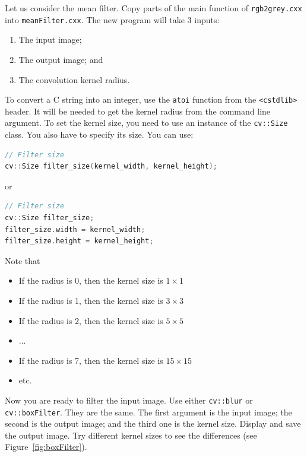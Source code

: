 \documentclass[english,a4paper,12pt,oneside]{article}
\begin{document}
Let us consider the mean filter. 
Copy parts of the main function of \verb+rgb2grey.cxx+ into \verb+meanFilter.cxx+.
The new program will take 3 inputs: 
\begin{enumerate}
	\item The input image;
	\item The output image; and
	\item The convolution kernel radius.
\end{enumerate}
To convert a C string into an integer, use the \verb+atoi+ function from the \verb+<cstdlib>+ header. 
It will be needed to get the kernel radius from the command line argument. 
To set the kernel size, you need to use an instance of the \verb+cv::Size+ class. 
You also have to specify its size. 
You can use:
\begin{lstlisting}[language=c++]
// Filter size
cv::Size filter_size(kernel_width, kernel_height);
\end{lstlisting}
or 
\begin{lstlisting}[language=c++]
// Filter size
cv::Size filter_size;
filter_size.width = kernel_width;
filter_size.height = kernel_height;
\end{lstlisting}
Note that 
\begin{itemize}
	\item If the radius is 0, then the kernel size is $1\times1$    
	\item If the radius is 1, then the kernel size is $3\times3$    
	\item If the radius is 2, then the kernel size is $5\times5$    
	\item ...
	\item If the radius is 7, then the kernel size is $15\times15$    
	\item etc.
\end{itemize}
Now you are ready to filter the input image. Use either \verb+cv::blur+ or \verb+cv::boxFilter+. 
They are the same. 
The first argument is the input image; the second is the output image; and the third one is the kernel size. 
Display and save the output image. 
Try different kernel sizes to see the differences (see Figure~\ref{fig:boxFilter}). 
\end{document}
